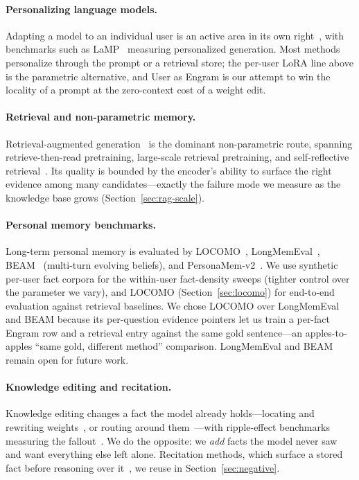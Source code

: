 \documentclass[letterpaper]{article} %
\begin{document}
\paragraph{Personalizing language models.} Adapting a model to an
individual user is an active area in its own
right~\citep{zhang2024personalization,liu2025personalizedllm,xu2026personalizedagents},
with benchmarks such as LaMP~\citep{salemi2024lamp} measuring
personalized generation. Most methods personalize through the
prompt or a retrieval store; the per-user LoRA line above is the
parametric alternative, and User as Engram is our attempt to win
the locality of a prompt at the zero-context cost of a weight
edit.

\paragraph{Retrieval and non-parametric memory.}
Retrieval-augmented generation~\citep{lewis2020rag,gao2023ragsurvey}
is the dominant non-parametric route, spanning retrieve-then-read
pretraining, large-scale retrieval pretraining, and self-reflective
retrieval~\citep{guu2020realm,khandelwal2020knnlm,borgeaud2022retro,izacard2023atlas,asai2024selfrag}.
Its quality is bounded by the encoder's ability to surface the right
evidence among many candidates---exactly the failure mode we measure
as the knowledge base grows (Section~\ref{sec:rag-scale}).

\paragraph{Personal memory benchmarks.} Long-term personal memory
is evaluated by LOCOMO~\citep{maharana2024locomo},
LongMemEval~\citep{wu2024longmemeval},
BEAM~\citep{liu2025beam} (multi-turn evolving beliefs), and
PersonaMem-v2~\citep{personamem2025}. We use synthetic per-user
fact corpora for the within-user fact-density sweeps (tighter
control over the parameter we vary), and LOCOMO
(Section~\ref{sec:locomo}) for end-to-end evaluation against
retrieval baselines. We chose LOCOMO over LongMemEval and BEAM
because its per-question evidence pointers let us train a
per-fact Engram row and a retrieval entry against the same gold
sentence---an apples-to-apples ``same gold, different
method'' comparison. LongMemEval and BEAM remain open for
future work.

\paragraph{Knowledge editing and recitation.}
Knowledge editing changes a fact the model already
holds---locating and rewriting weights~\citep{meng2022rome,meng2023memit,dai2022knowledge,yao2023editing},
or routing around them~\citep{mitchell2022mend,mitchell2022serac,wang2024wise}---with
ripple-effect benchmarks measuring the
fallout~\citep{mquake2023,rippleedits2023,counterfact2022}. We do the
opposite: we \emph{add} facts the model never saw and want everything
else left alone. Recitation methods, which surface a stored fact
before reasoning over it~\citep{srrag2024,sun2023recitation}, we reuse
in Section~\ref{sec:negative}.
\end{document}
